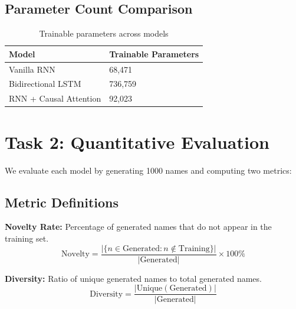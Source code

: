 \documentclass[11pt,a4paper]{article}
\begin{document}
\subsection{Parameter Count Comparison}
\begin{table}[H]
\centering
\caption{Trainable parameters across models}
\renewcommand{\arraystretch}{1.3}
\begin{tabularx}{\textwidth}{lX}
\toprule
\textbf{Model} & \textbf{Trainable Parameters} \\
\midrule
Vanilla RNN & 68,471 \\
Bidirectional LSTM & 736,759 \\
RNN + Causal Attention & 92,023 \\
\bottomrule
\end{tabularx}
\end{table}

\section{Task 2: Quantitative Evaluation}

We evaluate each model by generating 1000 names and computing two metrics:

\subsection{Metric Definitions}

\textbf{Novelty Rate:} Percentage of generated names that do not appear in the training set.
\begin{equation}
\text{Novelty} = \frac{|\{n \in \text{Generated} : n \notin \text{Training}\}|}{|\text{Generated}|} \times 100\%
\end{equation}

\textbf{Diversity:} Ratio of unique generated names to total generated names.
\begin{equation}
\text{Diversity} = \frac{|\text{Unique}(\text{Generated})|}{|\text{Generated}|}
\end{equation}
\end{document}
